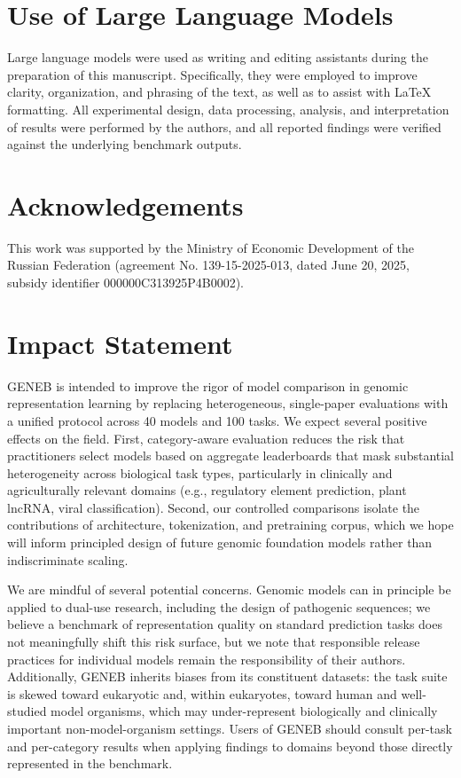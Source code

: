 \documentclass{article}
\theoremstyle{plain}
\theoremstyle{definition}
\theoremstyle{remark}
\begin{document}
\section{Use of Large Language Models}
\label{app:llm_usage}

Large language models were used as writing and editing assistants
during the preparation of this manuscript. Specifically, they were
employed to improve clarity, organization, and phrasing of the
text, as well as to assist with LaTeX formatting. All experimental
design, data processing, analysis, and interpretation of results
were performed by the authors, and all reported findings were
verified against the underlying benchmark outputs.

\section*{Acknowledgements}

This work was supported by the Ministry of Economic Development of the Russian Federation (agreement No. 139-15-2025-013, dated June 20, 2025, subsidy identifier 000000C313925P4B0002).

\section*{Impact Statement}

GENEB is intended to improve the rigor of model comparison in
genomic representation learning by replacing heterogeneous,
single-paper evaluations with a unified protocol across 40 models
and 100 tasks. We expect several positive effects on the field.
First, category-aware evaluation reduces the risk that
practitioners select models based on aggregate leaderboards that
mask substantial heterogeneity across biological task types,
particularly in clinically and agriculturally relevant domains
(e.g., regulatory element prediction, plant lncRNA, viral
classification). Second, our controlled comparisons isolate the
contributions of architecture, tokenization, and pretraining
corpus, which we hope will inform principled design of future
genomic foundation models rather than indiscriminate scaling.

We are mindful of several potential concerns. Genomic models can
in principle be applied to dual-use research, including the design
of pathogenic sequences; we believe a benchmark of representation
quality on standard prediction tasks does not meaningfully shift
this risk surface, but we note that responsible release practices
for individual models remain the responsibility of their authors.
Additionally, GENEB inherits biases from its constituent datasets:
the task suite is skewed toward eukaryotic and, within eukaryotes,
toward human and well-studied model organisms, which may
under-represent biologically and clinically important
non-model-organism settings. Users of GENEB should consult
per-task and per-category results when applying findings to
domains beyond those directly represented in the benchmark.
\end{document}
